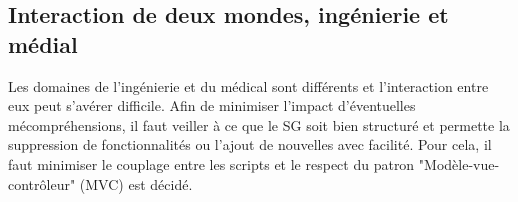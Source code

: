 		
	\subsection*{Interaction de deux mondes, ingénierie et médial}
		Les domaines de l'ingénierie et du médical sont différents et l'interaction entre eux peut s'avérer difficile. %
		Afin de minimiser l'impact d'éventuelles mécompréhensions, il faut veiller à ce que le SG soit bien structuré et permette la suppression de fonctionnalités ou l'ajout de nouvelles avec facilité. Pour cela, il faut minimiser le couplage entre les scripts et le respect du patron "Modèle-vue-contrôleur" (MVC) est décidé.
		\\
		
